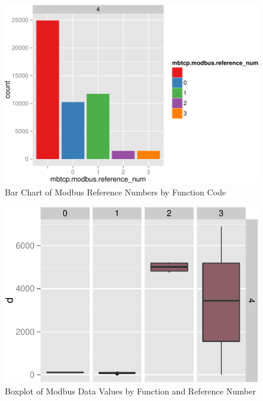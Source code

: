 \documentclass[11pt,]{article}
\begin{document}
\begin{figure}

{\centering \includegraphics{thesis_files/figure-latex/unnamed-chunk-31-1} 

}

\caption{Bar Chart of Modbus Reference Numbers by Function Code}\label{fig:unnamed-chunk-31}
\end{figure}

\begin{figure}

{\centering \includegraphics{thesis_files/figure-latex/unnamed-chunk-32-1} 

}

\caption{Boxplot of Modbus Data Values by Function and Reference Number}\label{fig:unnamed-chunk-32}
\end{figure}
\end{document}
